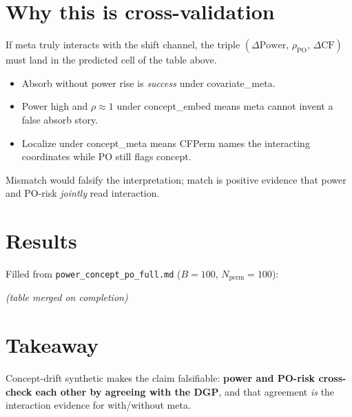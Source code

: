 \documentclass[11pt]{article}
\begin{document}
\section{Why this is cross-validation}
If meta truly interacts with the shift channel, the triple
$(\Delta\mathrm{Power},\,\rho_{\mathrm{PO}},\,\Delta\mathrm{CF})$ must
land in the predicted cell of the table above.
\begin{itemize}[leftmargin=*]
  \item Absorb without power rise is \emph{success} under covariate\_meta.
  \item Power high and $\rho\approx 1$ under concept\_embed means meta
        cannot invent a false absorb story.
  \item Localize under concept\_meta means CFPerm names the interacting
        coordinates while PO still flags concept.
\end{itemize}
Mismatch would falsify the interpretation; match is positive evidence
that power and PO-risk \emph{jointly} read interaction.

\section{Results}
Filled from \texttt{power\_concept\_po\_full.md} ($B{=}100$, $N_{\mathrm{perm}}{=}100$):

\textit{(table merged on completion)}

\section{Takeaway}
Concept-drift synthetic makes the claim falsifiable:
\textbf{power and PO-risk cross-check each other by agreeing with the DGP},
and that agreement \emph{is} the interaction evidence for with/without meta.
\end{document}
